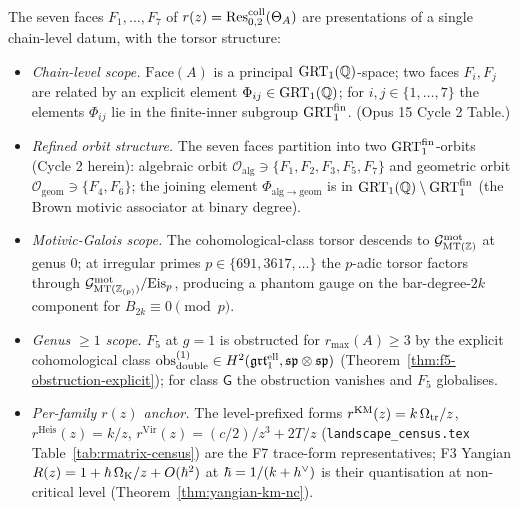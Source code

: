 \begin{theorem}\ClaimStatusScoped
\label{thm:seven-faces-two-scope}
The seven faces $F_1, \ldots, F_7$ of $r(z) = \operatorname{Res}^{\mathrm{coll}}_{0,2}(\Theta_A)$
are presentations of a single chain-level datum, with the torsor
structure:

\begin{itemize}
\item \emph{Chain-level scope.}
   $\mathrm{Face}(A)$ is a principal $\mathrm{GRT}_1(\mathbb{Q})$-space; two faces
   $F_i, F_j$ are related by an explicit element
   $\Phi_{ij} \in \mathrm{GRT}_1(\mathbb{Q})$; for $i, j \in \{1, \ldots, 7\}$ the
   elements $\Phi_{ij}$ lie in the finite-inner subgroup
   $\mathrm{GRT}_1^{\mathrm{fin}}$. (Opus 15 Cycle 2 Table.)

\item \emph{Refined orbit structure.}
   The seven faces partition into two $\mathrm{GRT}_1^{\mathrm{fin}}$-orbits
   (Cycle 2 herein): algebraic orbit $\mathcal{O}_{\mathrm{alg}} \ni \{F_1, F_2, F_3, F_5, F_7\}$
   and geometric orbit $\mathcal{O}_{\mathrm{geom}} \ni \{F_4, F_6\}$;
   the joining element $\Phi_{\mathrm{alg}\to\mathrm{geom}}$ is in
   $\mathrm{GRT}_1(\mathbb{Q}) \setminus \mathrm{GRT}_1^{\mathrm{fin}}$ (the Brown motivic associator at
   binary degree).

\item \emph{Motivic-Galois scope.}
   The cohomological-class torsor descends to
   $\mathcal{G}^{\mathrm{mot}}_{\mathrm{MT}(\mathbb{Z})}$ at genus $0$; at irregular primes
   $p \in \{691, 3617, \ldots\}$ the $p$-adic torsor factors through
   $\mathcal{G}^{\mathrm{mot}}_{\mathrm{MT}(\mathbb{Z}_{(p)})}/\mathrm{Eis}_p$, producing a phantom
   gauge on the bar-degree-$2k$ component for $B_{2k} \equiv 0 \pmod p$.

\item \emph{Genus $\ge 1$ scope.}
   $F_5$ at $g = 1$ is obstructed for $r_{\max}(A) \ge 3$ by the
   explicit cohomological class
   $\mathrm{obs}^{(1)}_{\mathrm{double}} \in H^2(\mathfrak{grt}_1^{\mathrm{ell}}, \mathfrak{sp} \otimes \mathfrak{sp})$
   (Theorem~\ref{thm:f5-obstruction-explicit}); for class $\mathsf{G}$
   the obstruction vanishes and $F_5$ globalises.

\item \emph{Per-family $r(z)$ anchor.}
   The level-prefixed forms
   $r^{\mathrm{KM}}(z) = k\,\Omega_{\mathrm{tr}}/z$,
   $r^{\mathrm{Heis}}(z) = k/z$,
   $r^{\mathrm{Vir}}(z) = (c/2)/z^3 + 2T/z$
   (\texttt{landscape\_census.tex} Table~\ref{tab:rmatrix-census}) are
   the F7 trace-form representatives; F3 Yangian
   $R(z) = 1 + \hbar\,\Omega_{\mathrm{K}}/z + O(\hbar^2)$ at $\hbar = 1/(k+h^{\vee})$ is
   their quantisation at non-critical level (Theorem~\ref{thm:yangian-km-nc}).
\end{itemize}
\end{theorem}

